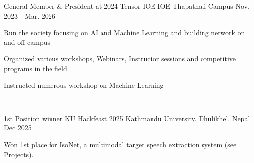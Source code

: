

\begin{cventries}

  \cventry
    {General Member \& President at 2024} %
    {Tensor IOE} %
    {IOE Thapathali Campus} %
    {Nov. 2023 - Mar. 2026} %
    {
      \begin{cvitems} %
        \item {Run the society focusing on AI and Machine Learning and building network on and off campus.}
        \item {Organized various workshops, Webinars, Instructor sessions and competitive programs in the field}
        \item {Instructed numerous workshop on Machine Learning}
      \end{cvitems}
      ‎ 
    }

  \cventry
    {1st Position winner} %
    {KU Hackfeast 2025} %
    {Kathmandu University, Dhulikhel, Nepal} %
    {Dec 2025} %
    {
      \begin{cvitems} %
        \item {Won 1st place for IsoNet, a multimodal target speech extraction system (see Projects).}
      \end{cvitems}
    }

\end{cventries}
